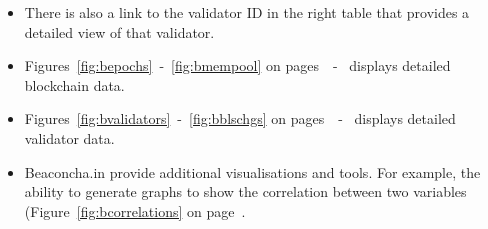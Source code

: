 \documentclass[UTF8]{article}
\begin{document}
{\begin{itemize}
\begin{itemize}
		\item There is also a link to the validator ID in the right table that provides a detailed view of that validator.
		\item Figures~\ref{fig:bepochs}~-~\ref{fig:bmempool} on pages~\pageref{fig:bepochs}~-~\pageref{fig:bmempool} displays detailed blockchain data.
		\item Figures~\ref{fig:bvalidators}~-~\ref{fig:bblschgs} on pages~\pageref{fig:bvalidators}~-~\pageref{fig:bblschgs} displays detailed validator data.
		\item Beaconcha.in provide additional visualisations and tools. For example, the ability to generate graphs to show the correlation between two variables (Figure~\ref{fig:bcorrelations} on page~\pageref{fig:bcorrelations}.
	\end{itemize}


\end{itemize}}
\end{document}
